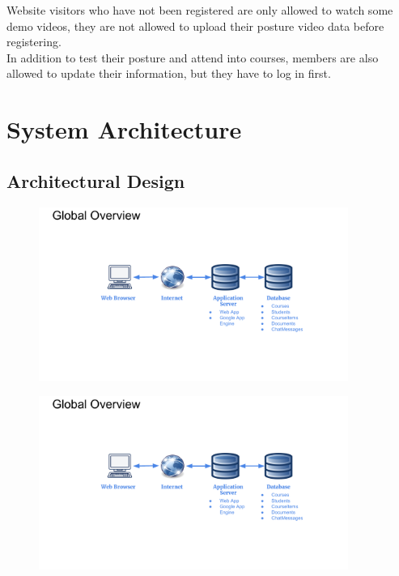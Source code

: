 \documentclass[16pt]{scrreprt}
\begin{document}
 
Website visitors who have not been registered are only allowed to watch some demo videos, they are not allowed to upload their posture video data before registering.\\

 
In addition to test their posture and attend into courses, members are also allowed to update their information, but they have to log in first.\\

\chapter{System Architecture}

\section{Architectural Design}

\begin{figure}[ht]
  \centering
  \includegraphics[page=1,width=0.9\textwidth]{diagrams/SDD_Diagrams.pdf}
  \label{fig:SDD_1}
\end{figure}

\begin{figure}[ht]
  \centering
  \includegraphics[page=2,width=0.9\textwidth]{diagrams/SDD_Diagrams.pdf}
  \label{fig:SDD_1}
\end{figure}
\end{document}
